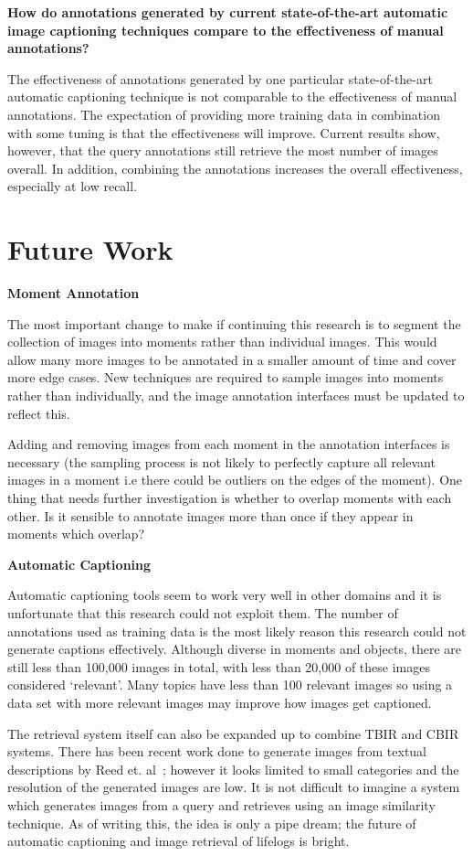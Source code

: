 \textbf{How do annotations generated by current state-of-the-art automatic image captioning techniques compare to the effectiveness of manual annotations?}

The effectiveness of annotations generated by one particular state-of-the-art automatic captioning technique is not comparable to the effectiveness of manual annotations. The expectation of providing more training data in combination with some tuning is that the effectiveness will improve. Current results show, however, that the query annotations still retrieve the most number of images overall. In addition, combining the annotations increases the overall effectiveness, especially at low recall.

\section{Future Work}

\textbf{Moment Annotation}

The most important change to make if continuing this research is to segment the collection of images into moments rather than individual images. This would allow many more images to be annotated in a smaller amount of time and cover more edge cases. New techniques are required to sample images into moments rather than individually, and the image annotation interfaces must be updated to reflect this. 

Adding and removing images from each moment in the annotation interfaces is necessary (the sampling process is not likely to perfectly capture all relevant images in a moment i.e there could be outliers on the edges of the moment). One thing that needs further investigation is whether to overlap moments with each other. Is it sensible to annotate images more than once if they appear in moments which overlap?

\textbf{Automatic Captioning}

Automatic captioning tools seem to work very well in other domains and it is unfortunate that this research could not exploit them. The number of annotations used as training data is the most likely reason this research could not generate captions effectively. Although diverse in moments and objects, there are still less than 100,000 images in total, with less than 20,000 of these images considered `relevant'. Many topics have less than 100 relevant images so using a data set with more relevant images may improve how images get captioned. 

The retrieval system itself can also be expanded up to combine TBIR and CBIR systems. There has been recent work done to generate images from textual descriptions by Reed et. al~\cite{reed2016generative}; however it looks limited to small categories and the resolution of the generated images are low. It is not difficult to imagine a system which generates images from a query and retrieves using an image similarity technique. As of writing this, the idea is only a pipe dream; the future of automatic captioning and image retrieval of lifelogs is bright.

